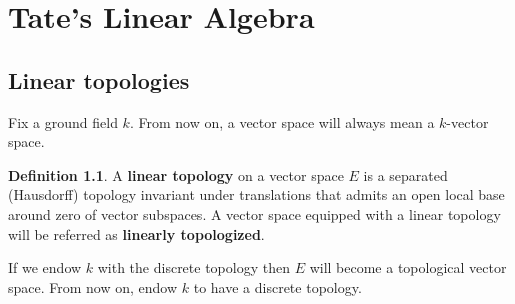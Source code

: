 \documentclass{book}[12pt]
\theoremstyle{definition}
\newtheorem{definition}{Definition}[chapter]
\theoremstyle{plain}
\theoremstyle{remark}
\begin{document}
	\chapter{Tate's Linear Algebra}
	\section{Linear topologies}

	Fix a ground field $k$. From now on, a vector space will always mean a $k$-vector space.
	\begin{definition}\label{linear_topology}
		A \textbf{linear topology} on a vector space $E$ is a separated (Hausdorff) topology invariant under translations that admits an open local base around zero of vector subspaces. A vector space equipped with a linear topology will be referred as \textbf{linearly topologized}.
	\end{definition}
	If we endow $k$ with the discrete topology then $E$ will become a topological vector space. From now on, endow $k$ to have a discrete topology. \\
	
\end{document}
